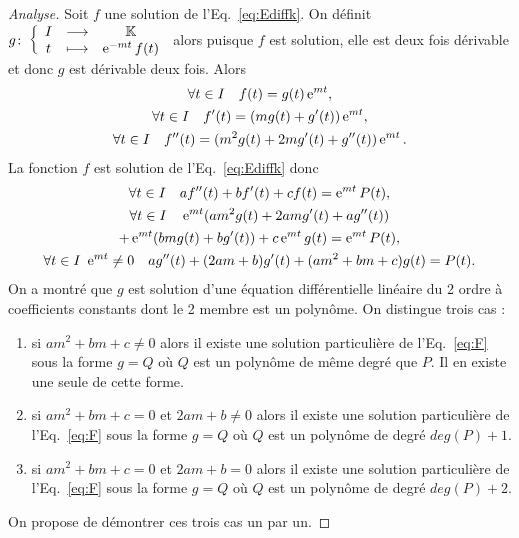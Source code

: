 \begin{proof}[Analyse]
Soit  $f$ une solution de l'Eq.~\eqref{eq:Ediffk}. On définit $g\colon \left\{\begin{array}{ccc} I & \longrightarrow &\mathbb{K}\\ t & \longmapsto & \operatorname{e}^{-mt}f(t) \end{array} \right.$ alors puisque $f$ est solution, elle est deux fois dérivable et donc $g$ est dérivable deux fois. Alors 
\begin{gather}
  \forall t \in I \quad f(t)=g(t)\operatorname{e}^{mt}, \\ 
  \forall t \in I \quad f'(t)= (mg(t)+g'(t))\operatorname{e}^{mt}, \\
  \forall t \in I \quad f''(t)=(m^2g(t)+2mg'(t)+g''(t))\operatorname{e}^{mt}.
\end{gather}
La fonction $f$ est solution de l'Eq.~\eqref{eq:Ediffk} donc 
\begin{gather}
  \forall t \in I \quad af''(t)+bf'(t)+cf(t)=\operatorname{e}^{mt} P(t), \\
  \forall t \in I \quad  \operatorname{e}^{mt}(am^2g(t)+2amg'(t)+ag''(t))  \notag \\ +\operatorname{e}^{mt}(bmg(t)+bg'(t))+c\operatorname{e}^{mt}g(t)=\operatorname{e}^{mt}P(t), \\
  \forall t \in I \ \operatorname{e}^{mt} \neq 0  \quad  ag''(t)+(2am+b)g'(t) +(am^2+bm+c)g(t)=P(t). \label{eq:F}
\end{gather}
On a montré que $g$ est solution d'une équation différentielle linéaire du 2 ordre à coefficients constants dont le 2 membre est un polynôme. On distingue trois cas :
\begin{enumerate}
\item si $am^2+bm+c \neq 0$ alors il existe une solution particulière de l'Eq.~\eqref{eq:F} sous la forme $g=Q$ où $Q$ est un polynôme de même degré que $P$. Il en existe une seule de cette forme.
\item si $am^2+bm+c=0$ et $2am+b \neq 0$ alors il existe une solution particulière de l'Eq.~\eqref{eq:F} sous la forme $g=Q$ où $Q$ est un polynôme de degré $deg(P)+1$.
\item si  $am^2+bm+c=0$ et $2am+b = 0$ alors il existe une solution particulière de l'Eq.~\eqref{eq:F} sous la forme $g=Q$ où $Q$ est un polynôme de degré $deg(P)+2$.
\end{enumerate}
On propose de démontrer ces trois cas un par un.


\end{proof}

